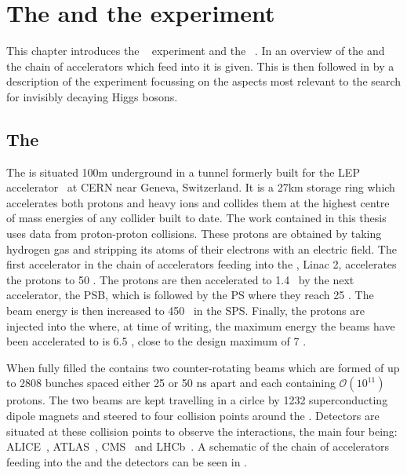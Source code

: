 \chapter{The \LHC and the \CMS experiment}
\label{chap:detector}

This chapter introduces the \CMS~\cite{Chatrchyan:2008aa} experiment and the \LHC~\cite{1748-0221-3-08-S08001}. In  an overview of the \LHC and the chain of accelerators which feed into it is given. This is then followed in  by a description of the \CMS experiment focussing on the aspects most relevant to the search for invisibly decaying Higgs bosons.

\section{The \LHC}
\label{sec:lhc}
The \LHC is situated 100m underground in a tunnel formerly built for the LEP accelerator~\cite{lepdesign} at CERN near Geneva, Switzerland. It is a 27km storage ring which accelerates both protons and heavy ions and collides them at the highest centre of mass energies of any collider built to date. The work contained in this thesis uses data from proton-proton collisions. These protons are obtained by taking hydrogen gas and stripping its atoms of their electrons with an electric field. The first accelerator in the chain of accelerators feeding into the \LHC, Linac 2, accelerates the protons to 50 \MeV. The protons are then accelerated to 1.4 \GeV~by the next accelerator, the \ac{PSB}, which is followed by the \ac{PS} where they reach 25 \GeV. The beam energy is then increased to 450 \GeV~in the \ac{SPS}. Finally, the protons are injected into the \LHC where, at time of writing, the maximum energy the beams have been accelerated to is 6.5 \TeV, close to the design maximum of 7 \TeV.

When fully filled the \LHC contains two counter-rotating beams which are formed of up to 2808 bunches spaced either 25 or 50 ns apart and each containing $\mathcal{O}(10^{11})$ protons. The two beams are kept travelling in a cirlce by 1232 superconducting dipole magnets and steered to four collision points around the \LHC. Detectors are situated at these collision points to observe the interactions, the main four being: ALICE~\cite{Aamodt:2008zz}, ATLAS~\cite{Aad:1129811}, CMS~\cite{Chatrchyan:2008aa} and LHCb~\cite{Alves:2008zz}. A schematic of the chain of accelerators feeding into the \LHC and the \LHC detectors can be seen in .

